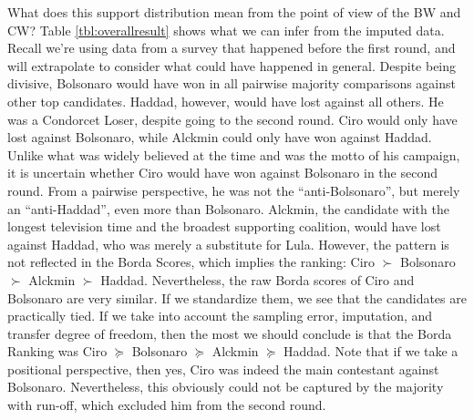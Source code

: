 \documentclass[hidelinks,11pt]{article} \usepackage[utf8]{inputenc}
\begin{document}
What does this support distribution mean from the point of view of the BW and
CW? Table \ref{tbl:overallresult} shows what we can infer from the imputed data.
Recall we're using data from a survey that happened before the first round, and
will extrapolate to consider what could have happened in general. Despite being
divisive, Bolsonaro would have won in all pairwise majority comparisons against
other top candidates. Haddad, however, would have lost against all others. He
was a Condorcet Loser, despite going to the second round. Ciro would only have
lost against Bolsonaro, while Alckmin could only have won against Haddad. Unlike
what was widely believed at the time and was the motto of his campaign, it is
uncertain whether Ciro would have won against Bolsonaro in the second round.
From a pairwise perspective, he was not the ``anti-Bolsonaro'', but merely an
``anti-Haddad'', even more than Bolsonaro. Alckmin, the candidate with the
longest television time and the broadest supporting coalition, would have lost
against Haddad, who was merely a substitute for Lula. However, the pattern is
not reflected in the Borda Scores, which implies the ranking: Ciro \(\succ\) Bolsonaro \(\succ\)
Alckmin \(\succ\) Haddad. Nevertheless, the raw Borda scores of Ciro and Bolsonaro are
very similar. If we standardize them, we see that the candidates are practically
tied. If we take into account the sampling error, imputation, and transfer
degree of freedom, then the most we should conclude is that the Borda Ranking
was Ciro \(\succeq\) Bolsonaro \(\succeq\) Alckmin \(\succeq\) Haddad. Note that if we take a
positional perspective, then yes, Ciro was indeed the main contestant against
Bolsonaro. Nevertheless, this obviously could not be captured by the majority with run-off, which excluded him from the second round.
\end{document}
